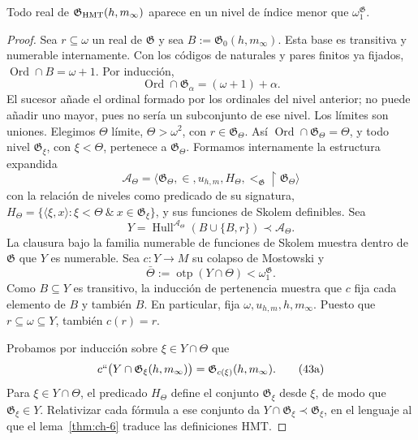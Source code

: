 \begin{lemma}
\label{thm:ch-8}
Todo real de
\(\mathfrak G_{\rm HMT}(h,m_\infty)\) aparece en un nivel de índice menor que
\(\omega_1^{\mathfrak G}\).

\end{lemma}
\begin{proof}
Sea \(r\subseteq\omega\) un real de \(\mathfrak G\) y sea
\(B:=\mathfrak G_0(h,m_\infty)\). Esta base es transitiva y numerable
internamente. Con los códigos de naturales y pares finitos ya fijados,
\(\operatorname{Ord}\cap B=\omega+1\). Por inducción,
\[
 \operatorname{Ord}\cap\mathfrak G_\alpha=(\omega+1)+\alpha.
\]
El sucesor añade el ordinal formado por los ordinales del nivel anterior;
no puede añadir uno mayor, pues no sería un subconjunto de ese nivel. Los
límites son uniones. Elegimos \(\Theta\) límite, \(\Theta>\omega^2\),
con \(r\in\mathfrak G_\Theta\). Así
\(\operatorname{Ord}\cap\mathfrak G_\Theta=\Theta\), y todo nivel
\(\mathfrak G_\xi\), con \(\xi<\Theta\), pertenece a
\(\mathfrak G_\Theta\). Formamos internamente la estructura expandida
\[
 \mathcal A_\Theta=
 \langle\mathfrak G_\Theta,\in,u_{h,m},
         H_\Theta,<_{\mathfrak G}\!\upharpoonright\mathfrak G_\Theta\rangle
\]
con la relación de niveles como predicado de su signatura,
\(H_\Theta=\{\langle\xi,x\rangle:\xi<\Theta\ \&\
x\in\mathfrak G_\xi\}\), y sus funciones de Skolem definibles. Sea
\[
 Y=\operatorname{Hull}^{\mathcal A_\Theta}
   (B\cup\{B,r\})\prec\mathcal A_\Theta .
\]
La clausura bajo la familia numerable de funciones de Skolem muestra dentro
de \(\mathfrak G\) que \(Y\) es numerable. Sea
\(c:Y\rightarrow M\) su colapso de Mostowski y
\[
 \bar\Theta:=\operatorname{otp}(Y\cap\Theta)
 <\omega_1^{\mathfrak G}.
\]
Como \(B\subseteq Y\) es transitivo, la inducción de pertenencia muestra
que \(c\) fija cada elemento de \(B\) y también \(B\). En particular,
fija \(\omega,u_{h,m},h,m_\infty\). Puesto que
\(r\subseteq\omega\subseteq Y\), también \(c(r)=r\).

Probamos por inducción sobre \(\xi\in Y\cap\Theta\) que
\[
 c``\bigl(Y\cap\mathfrak G_\xi(h,m_\infty)\bigr)
 =\mathfrak G_{c(\xi)}(h,m_\infty).
\tag{43a}\label{eq:ch-condensacion}
\]
Para \(\xi\in Y\cap\Theta\), el predicado \(H_\Theta\) define el
conjunto \(\mathfrak G_\xi\) desde \(\xi\), de modo que
\(\mathfrak G_\xi\in Y\). Relativizar cada fórmula a ese conjunto da
\(Y\cap\mathfrak G_\xi\prec\mathfrak G_\xi\), en el lenguaje al que
el lema~\ref{thm:ch-6} traduce las definiciones HMT.


\end{proof}
